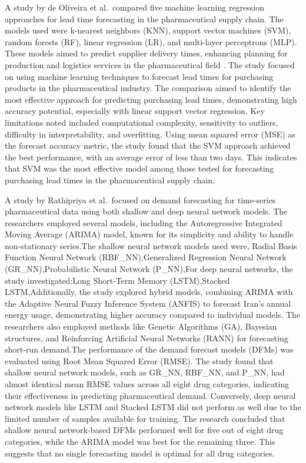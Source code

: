 \documentclass[
  authoryear,
  preprint,
  3p]{elsarticle}
\begin{document}
A study by de Oliveira et al.~compared five machine learning regression
approaches for lead time forecasting in the pharmaceutical supply chain.
The models used were k-nearest neighbors (KNN), support vector machines
(SVM), random forests (RF), linear regression (LR), and multi-layer
perceptrons (MLP). These models aimed to predict supplier delivery
times, enhancing planning for production and logistics services in the
pharmaceutical field \citep{de2021lead}. The study focused on using
machine learning techniques to forecast lead times for purchasing
products in the pharmaceutical industry. The comparison aimed to
identify the most effective approach for predicting purchasing lead
times, demonstrating high accuracy potential, especially with linear
support vector regression. Key limitations noted included computational
complexity, sensitivity to outliers, difficulty in interpretability, and
overfitting. Using mean squared error (MSE) as the forecast accuracy
metric, the study found that the SVM approach achieved the best
performance, with an average error of less than two days. This indicates
that SVM was the most effective model among those tested for forecasting
purchasing lead times in the pharmaceutical supply
chain\citep[de2021lead]{inproceedings}.

A study by Rathipriya et al.~focused on demand forecasting for
time-series pharmaceutical data using both shallow and deep neural
network models\citep{rathipriya2023demand}. The researchers employed
several models, including the Autoregressive Integrated Moving Average
(ARIMA) model, known for its simplicity and ability to handle
non-stationary series.The shallow neural network models used were,
Radial Basis Function Neural Network (RBF\_NN),Generalized Regression
Neural Network (GR\_NN),Probabilistic Neural Network (P\_NN),For deep
neural networks, the study investigated:Long Short-Term Memory
(LSTM),Stacked LSTM,Additionally, the study explored hybrid models,
combining ARIMA with the Adaptive Neural Fuzzy Inference System (ANFIS)
to forecast Iran's annual energy usage, demonstrating higher accuracy
compared to individual models. The researchers also employed methods
like Genetic Algorithms (GA), Bayesian structures, and Reinforcing
Artificial Neural Networks (RANN) for forecasting short-run demand.The
performance of the demand forecast models (DFMs) was evaluated using
Root Mean Squared Error (RMSE). The study found that shallow neural
network models, such as GR\_NN, RBF\_NN, and P\_NN, had almost identical
mean RMSE values across all eight drug categories, indicating their
effectiveness in predicting pharmaceutical demand. Conversely, deep
neural network models like LSTM and Stacked LSTM did not perform as well
due to the limited number of samples available for training. The
research concluded that shallow neural network-based DFMs performed well
for five out of eight drug categories, while the ARIMA model was best
for the remaining three. This suggests that no single forecasting model
is optimal for all drug categories\citep[rathipriya2023demand]{article}.
\end{document}
